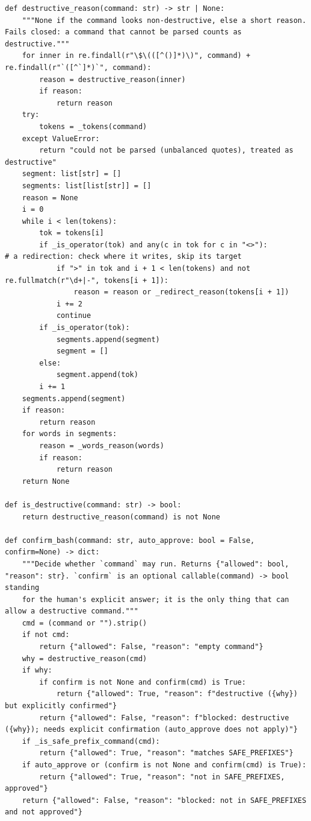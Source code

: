 \documentclass[11pt]{article}
\begin{document}
\begin{lstlisting}
def destructive_reason(command: str) -> str | None:
    """None if the command looks non-destructive, else a short reason. Fails closed: a command that cannot be parsed counts as destructive."""
    for inner in re.findall(r"\$\(([^()]*)\)", command) + re.findall(r"`([^`]*)`", command):
        reason = destructive_reason(inner)
        if reason:
            return reason
    try:
        tokens = _tokens(command)
    except ValueError:
        return "could not be parsed (unbalanced quotes), treated as destructive"
    segment: list[str] = []
    segments: list[list[str]] = []
    reason = None
    i = 0
    while i < len(tokens):
        tok = tokens[i]
        if _is_operator(tok) and any(c in tok for c in "<>"):          # a redirection: check where it writes, skip its target
            if ">" in tok and i + 1 < len(tokens) and not re.fullmatch(r"\d+|-", tokens[i + 1]):
                reason = reason or _redirect_reason(tokens[i + 1])
            i += 2
            continue
        if _is_operator(tok):
            segments.append(segment)
            segment = []
        else:
            segment.append(tok)
        i += 1
    segments.append(segment)
    if reason:
        return reason
    for words in segments:
        reason = _words_reason(words)
        if reason:
            return reason
    return None

def is_destructive(command: str) -> bool:
    return destructive_reason(command) is not None

def confirm_bash(command: str, auto_approve: bool = False, confirm=None) -> dict:
    """Decide whether `command` may run. Returns {"allowed": bool, "reason": str}. `confirm` is an optional callable(command) -> bool standing
    for the human's explicit answer; it is the only thing that can allow a destructive command."""
    cmd = (command or "").strip()
    if not cmd:
        return {"allowed": False, "reason": "empty command"}
    why = destructive_reason(cmd)
    if why:
        if confirm is not None and confirm(cmd) is True:
            return {"allowed": True, "reason": f"destructive ({why}) but explicitly confirmed"}
        return {"allowed": False, "reason": f"blocked: destructive ({why}); needs explicit confirmation (auto_approve does not apply)"}
    if _is_safe_prefix_command(cmd):
        return {"allowed": True, "reason": "matches SAFE_PREFIXES"}
    if auto_approve or (confirm is not None and confirm(cmd) is True):
        return {"allowed": True, "reason": "not in SAFE_PREFIXES, approved"}
    return {"allowed": False, "reason": "blocked: not in SAFE_PREFIXES and not approved"}
\end{lstlisting}
\endgroup
\end{document}
